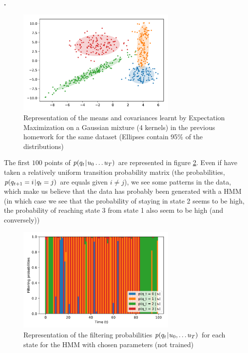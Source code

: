 \documentclass[a4paper, 11pt]{article}
\newcounter{cquestion}[subsection]
\renewcommand{\thecquestion}{\arabic{cquestion}}
\newenvironment{question}
{\par \vspace{0.5em} \noindent \stepcounter{cquestion} \hspace{-1em}
  \textbf{\thecquestion.}}
{}
\newcommand{\pcond}[2]{p(#1 \hspace{-.2em}\mid\hspace{-.2em} #2)}
\begin{document}
\begin{question}
  \begin{figure}[h!]
    \centering
    \includegraphics[width=0.7\textwidth]{clustering_notrain.pdf}
    \caption{Representation of the means and covariances learnt by
      Expectation Maximization on a Gaussian mixture (4 kernels) in
      the previous homework for the same dataset (Ellipses contain
      95\% of the distributions)}\label{fig:clustering-notrain}
  \end{figure}

  The first $100$ points of $\pcond{q_t}{u_0 \dots u_T}$ are
  represented in figure \ref{fig:filtering-notrain}. Even if have
  taken a relatively uniform transition probability matrix (the
  probabilities, $\pcond{q_{t+1} = i}{q_t = j}$ are equals given
  $i \ne j$), we see some patterns in the data, which make us believe
  that the data has probably been generated with a HMM (in which case
  we see that the probability of staying in state 2 seems to be high,
  the probability of reaching state 3 from state 1 also seem to be
  high (and conversely))

  \begin{figure}[h!]
    \centering
    \includegraphics[width=0.7\textwidth]{filtering_notrain.pdf}
    \caption{Representation of the filtering probabilities
      $\pcond{q_t}{u_0, \dots u_T}$ for each state for the HMM with
      chosen parameters (not trained)}\label{fig:filtering-notrain}
  \end{figure}

\end{question}
\end{document}
